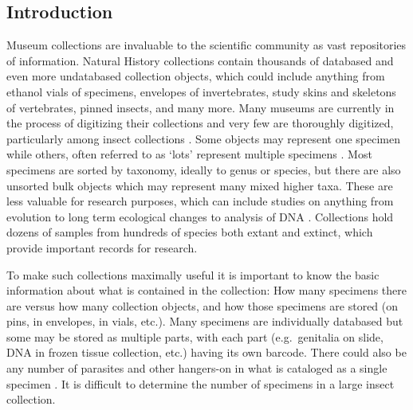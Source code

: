 \vspace{4mm}

\begin{multicols}{2}

\section{Introduction} 

Museum collections are invaluable to the scientific community as vast repositories of information. Natural History collections contain thousands of databased and even more undatabased collection objects, which could include anything from ethanol vials of specimens, envelopes of invertebrates, study skins and skeletons of vertebrates, pinned insects, and many more. Many museums are currently in the process of digitizing their collections and very few are thoroughly digitized, particularly among insect collections \citep{Sikesetal2016}. Some objects may represent one specimen while others, often referred to as ‘lots’ represent multiple specimens \citep{Sikes2015}. Most specimens are sorted by taxonomy, ideally to genus or species, but there are also unsorted bulk objects which may represent many mixed higher taxa. These are less valuable for research purposes, which can include studies on anything from evolution to long term ecological changes \citep{MunozPrice2019} to analysis of DNA \citep{vanderValketal2017}. Collections hold dozens of samples from hundreds of species both extant and extinct, which provide important records for research. 

To make such collections maximally useful it is important to know the basic information about what is contained in the collection: How many specimens there are versus how many collection objects, and how those specimens are stored (on pins, in envelopes, in vials, etc.). Many specimens are individually databased but some may be stored as multiple parts, with each part (e.g.\ genitalia on slide, DNA in frozen tissue collection, etc.) having its own barcode. There could also be any number of parasites and other hangers-on in what is cataloged as a single specimen \citep{Welickyetal2019, Sikes2015}. It is difficult to determine the number of specimens in a large insect collection. 
	

\end{multicols}

